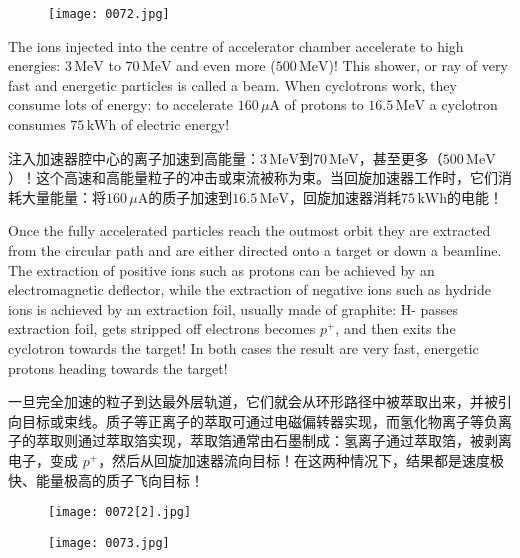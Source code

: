 \documentclass[dvipsnames, svgnames,a4paper,11pt]{article}
\begin{document}
\begin{figure}[ht]
    \centering
    \texttt{[image: 0072.jpg]}
     \label{fig63}
\end{figure}
  
The ions injected into the centre of accelerator chamber accelerate to high energies: $3\, \text{MeV}$ to $70\, \text{MeV}$ and even more ($500\, \text{MeV}$)! This shower, or ray of very fast and energetic particles is called a beam. When cyclotrons work, they consume lots of energy: to accelerate $160\, \mu\text{A}$ of protons to $16.5\, \text{MeV}$ a cyclotron consumes $75\, \text{kWh}$ of electric energy!
  
注入加速器腔中心的离子加速到高能量：$3\, \text{MeV}$到$70\, \text{MeV}$，甚至更多（$500\, \text{MeV}$）！这个高速和高能量粒子的冲击或束流被称为束。当回旋加速器工作时，它们消耗大量能量：将$160\, \mu\text{A}$的质子加速到$16.5\, \text{MeV}$，回旋加速器消耗$75\, \text{kWh}$的电能！

Once the fully accelerated particles reach the outmost orbit they are extracted from the circular path and are either directed onto a target or down a beamline. The extraction of positive ions such as protons can be achieved by an electromagnetic deflector, while the extraction of negative ions such as hydride ions is achieved by an extraction foil, usually made of graphite: H- passes extraction foil, gets stripped off electrons becomes $p^+$, and then exits the cyclotron towards the target! In both cases
the result are very fast, energetic protons heading towards the target!

一旦完全加速的粒子到达最外层轨道，它们就会从环形路径中被萃取出来，并被引向目标或束线。质子等正离子的萃取可通过电磁偏转器实现，而氢化物离子等负离子的萃取则通过萃取箔实现，萃取箔通常由石墨制成：氢离子通过萃取箔，被剥离电子，变成 $p^+$，然后从回旋加速器流向目标！在这两种情况下，结果都是速度极快、能量极高的质子飞向目标！

\begin{figure}[ht]
    \centering
    \texttt{[image: 0072[2].jpg]}
     \label{fig64}
\end{figure}

\begin{figure}[ht]
    \centering
    \texttt{[image: 0073.jpg]}
     \label{fig65}
\end{figure}
\end{document}
